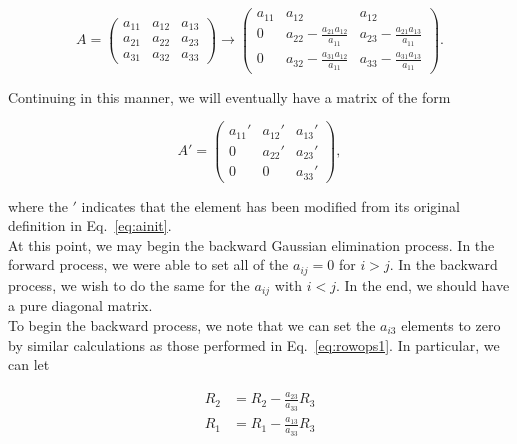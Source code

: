 \documentclass[12pt]{article}
\numberwithin{equation}{section}
\begin{document}
\begin{equation}
\label{eq:gaussflops}
A = \left(
\begin{array}{ccc}
a_{11} & a_{12} & a_{13} \\
a_{21} & a_{22} & a_{23} \\
a_{31} & a_{32} & a_{33}
\end{array}
\right) \rightarrow \left(
\begin{array}{ccc}
a_{11} & a_{12} & a_{12} \\
0 & a_{22} - \frac{a_{21}a_{12}}{a_{11}} & a_{23} - \frac{a_{21}a_{13}}{a_{11}} \\
0 & a_{32} - \frac{a_{31}a_{12}}{a_{11}} & a_{33} - \frac{a_{31}a_{13}}{a_{11}}
\end{array}\right).
\end{equation}
\vspace{.2cm}

\noindent Continuing in this manner, we will eventually have a matrix of the form 

\begin{equation}
A\prime = \left(
\begin{array}{ccc}
a_{11}\prime & a_{12}\prime & a_{13}\prime \\
0 & a_{22}\prime & a_{23}\prime \\
0 & 0 & a_{33}\prime
\end{array}\right),
\end{equation}
\vspace{.2cm}

\noindent where the $\prime$ indicates that the element has been modified from its original definition in Eq.~\ref{eq:ainit}.  
\\\indent At this point, we may begin the backward Gaussian elimination process.  In the forward process, we were able to set all of the $a_{ij}=0$ for $i>j$.  In the backward process, we wish to do the same for the $a_{ij}$ with $i<j$.  In the end, we should have a pure diagonal matrix.
\\\indent To begin the backward process, we note that we can set the $a_{i3}$ elements to zero by similar calculations as those performed in Eq.~\ref{eq:rowops1}.  In particular, we can let 

\begin{equation}
\label{eq:rowops2}
\begin{align}
R_{2} &= R_{2} - \frac{a_{23}}{a_{33}}R_{3} \\
R_{1} &= R_{1} - \frac{a_{13}}{a_{33}}R_{3}
\end{align}
\end{equation}
\end{document}
